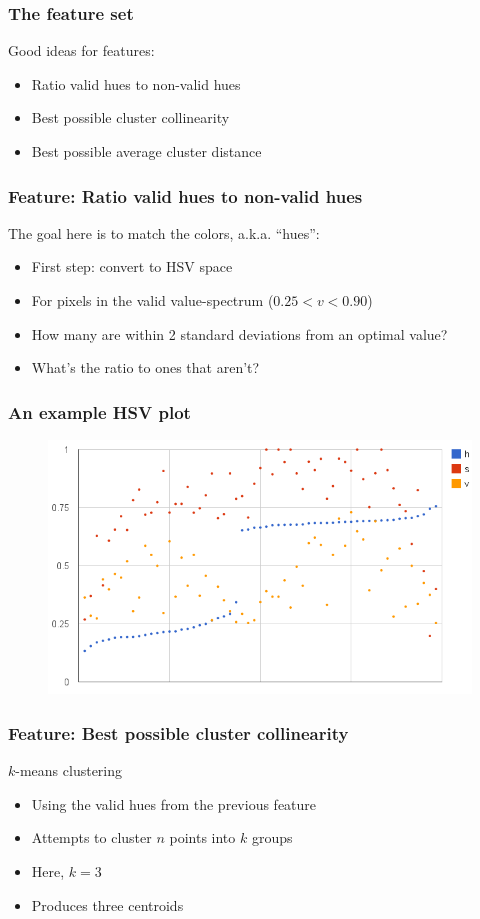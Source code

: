 \documentclass{beamer}
\begin{document}
\begin{frame}
    \frametitle{The feature set}
    Good ideas for features:
    \begin{itemize}
        \item Ratio valid hues to non-valid hues
        \item Best possible cluster collinearity
        \item Best possible average cluster distance
    \end{itemize}
\end{frame}

\begin{frame}
    \frametitle{Feature: Ratio valid hues to non-valid hues}
    The goal here is to match the colors, a.k.a. ``hues'':
    \begin{itemize}
        \item First step: convert to HSV space
        \item For pixels in the valid value-spectrum ($0.25 < v < 0.90$)
        \item How many are within 2 standard deviations from an optimal value?
        \item What's the ratio to ones that aren't?
    \end{itemize}
\end{frame}

\begin{frame}
    \frametitle{An example HSV plot}
    \begin{figure}
        \centering
        \includegraphics[width=0.85\paperwidth]{chart_1.png}
    \end{figure}
\end{frame}

\begin{frame}
    \frametitle{Feature: Best possible cluster collinearity}
    $k$-means clustering
    \begin{itemize}
        \item Using the valid hues from the previous feature
        \item Attempts to cluster $n$ points into $k$ groups
        \item Here, $k=3$
        \item Produces three centroids
    \end{itemize}
\end{frame}
\end{document}
